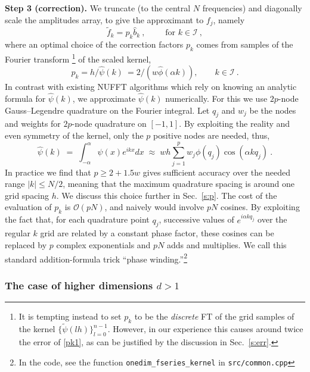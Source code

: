 \documentclass[10pt]{article}
\newcommand{\be}{\begin{equation}}
\newcommand{\ee}{\end{equation}}
\newcommand{\bigO}{{\mathcal O}}
\newcommand{\KK}{{\mathcal I}}     %
\newcommand{\ppsi}{{\tilde\psi}}   %
\newcommand{\al}{\alpha}           %
\begin{document}
{\bf Step 3 (correction).}
We truncate (to the central $N$ frequencies) and
diagonally scale the amplitudes array, to give
the approximant to $f_j$, namely
\be
\tilde f_k = p_k \hat{b}_k ~, \qquad \mbox{ for } k\in\KK
~,
\label{pb1}
\ee
where an optimal choice of the correction factors $p_k$ comes from
samples of the Fourier transform%
\footnote{It is tempting instead to set $p_k$ to be the {\em discrete} FT
  of the grid samples of the kernel $\{\ppsi(lh)\}_{l=0}^{n-1}$.
  However, in our
  experience this causes around twice the error of \eqref{pk1},
  as can be justified by the discussion in Sec.~\ref{s:err}.}
of the scaled kernel,
\be p_k = h / \hat\psi(k)~ = 2/(w\hat\phi(\alpha k)), \qquad k\in\KK
\label{pk1}
~.
\ee
In contrast with existing NUFFT algorithms
which rely on knowing an analytic formula for $\hat\psi(k)$,
we approximate $\hat\psi(k)$
numerically. For this we use $2p$-node Gauss--Legendre quadrature
on the Fourier integral. Let $q_j$ and $w_j$ be the nodes and weights
for $2p$-node quadrature on $[-1,1]$.
By exploiting the reality and even symmetry of the kernel,
only the $p$ positive nodes are needed, thus,
$$
\hat\psi(k) \;=\; 
\int_{-\al}^{\al} \psi(x) e^{ikx} dx
\;\approx\;
wh \sum_{j=1}^p w_j \phi(q_j) \cos (\al k q_j)
~.
$$
In practice we find that $p\ge 2+1.5 w$ gives sufficient accuracy
over the needed range $|k|\le N/2$,
meaning that the maximum quadrature spacing is around one
grid spacing $h$.
We discuss this choice further in Sec.~\ref{s:p}.
The cost of the evaluation of $p_k$ is $\bigO(pN)$,
and naively would involve $pN$ cosines.
By exploiting the fact that, for each quadrature point $q_j$,
successive values of $e^{i \al k q_j}$ over the regular $k$ grid are
related by a constant phase factor, these cosines
can be replaced by $p$ complex exponentials and $pN$ adds and multiplies.
We call this standard addition-formula trick
``phase winding.''\footnote{In the code, see the function
  {\tt onedim\_fseries\_kernel} in {\tt src/common.cpp}}
  


\subsubsection{The case of higher dimensions $d>1$}
\end{document}

